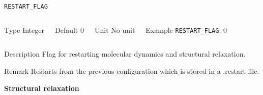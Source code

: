 \documentclass[xcolor=dvipsnames,t]{beamer}
\begin{document}
\begin{frame}[allowframebreaks]{\texttt{RESTART\_FLAG}} \label{RESTART_FLAG}
\vspace*{-12pt}
\begin{columns}
\begin{block}{Type}
Integer
\end{block}

\begin{block}{Default}
0
\end{block}

\begin{block}{Unit}
No unit
\end{block}

\begin{block}{Example}
\texttt{RESTART\_FLAG}: 0
\end{block}
\end{columns}

\begin{block}{Description}
Flag for restarting molecular dynamics and structural relaxation.
\end{block}

\begin{block}{Remark}
Restarts from the previous configuration which is stored in a .restart file.
\end{block}

\end{frame}


\begin{frame}[allowframebreaks,c]{} \label{Structural relaxation}

\begin{center}
\Huge \textbf{Structural relaxation}
\end{center}

\end{frame}
\end{document}
